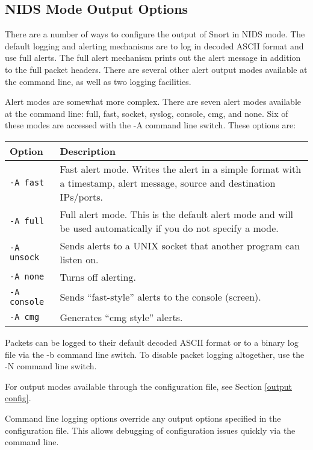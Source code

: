 \documentclass[english]{report}
\newenvironment{note}{
\samepage
    \vspace{10pt}{\textsf{
        {\hspace{7pt}\Huge{$\triangle$\hspace{-12.5pt}{\Large{$^!$}}}}\hspace{5pt}
        {\Large{NOTE}}
    }
    }
   \begin{center}
    \par\vspace{-17pt}

    \begin{lrbox}{\savepar}
    \begin{minipage}[r]{6in}
}
{
    \end{minipage}
    \end{lrbox}
    \fbox{
        \usebox{
            \savepar
	}
    }
    \par\vskip10pt
    \end{center}
}
\newenvironment{note}{
        \begin{rawhtml}
        <p><table border="1"><tr><td><b>
        Note:&nbsp;&nbsp;</b>
        \end{rawhtml}
}{
        \begin{rawhtml}
        </b></td></tr></table></p>
        \end{rawhtml}
}
\begin{document}
\subsection{NIDS Mode Output Options}

There are a number of ways to configure the output of Snort in NIDS
mode. The default logging and alerting mechanisms are to log in decoded
ASCII format and use full alerts. The full alert
mechanism prints out the alert message in addition to the full packet
headers. There are several other alert output modes available at the
command line, as well as two logging facilities.

Alert modes are somewhat more complex. There are seven alert modes available
at the command line: full, fast, socket, syslog, console, cmg, and
none. Six of these modes are accessed with the -A command line switch.
These options are:

\begin{tabular}{| l | p{5.4in} |}
\hline
{\bf Option} & {\bf Description}\\
\hline
\hline
{\tt -A fast} & Fast alert mode. Writes the alert in a simple format with a timestamp, alert message, source
and destination IPs/ports.\\
\hline
{\tt -A full} & Full alert mode. This is the default alert mode and will be used automatically if you do not specify a mode.\\
\hline
{\tt -A unsock} & Sends alerts to a UNIX socket that another program can listen on.\\
\hline
{\tt -A none} & Turns off alerting.\\
\hline
{\tt -A console} & Sends ``fast-style'' alerts to the console (screen).\\
\hline
{\tt -A cmg} & Generates ``cmg style'' alerts.\\
\hline
\end{tabular}

Packets can be logged to their default decoded ASCII format or to
a binary log file via the -b command line switch. To disable
packet logging altogether, use the -N command line switch.

For output modes available through the configuration file, see Section
\ref{output config}.

\begin{note}
Command line logging options override any output options specified 
in the configuration file. This allows debugging of configuration 
issues quickly via the command line.
\end{note}
\end{document}
